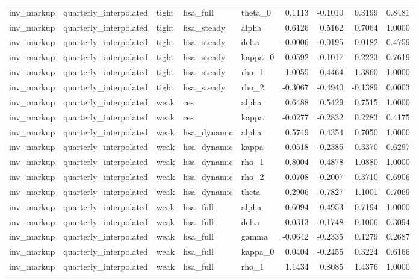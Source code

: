 \begin{tabular}{lllllrrrr}
inv\_markup & quarterly\_interpolated & tight & hsa\_full & theta\_0 & 0.1113 & -0.1010 & 0.3199 & 0.8481 \\
inv\_markup & quarterly\_interpolated & tight & hsa\_steady & alpha & 0.6126 & 0.5162 & 0.7064 & 1.0000 \\
inv\_markup & quarterly\_interpolated & tight & hsa\_steady & delta & -0.0006 & -0.0195 & 0.0182 & 0.4759 \\
inv\_markup & quarterly\_interpolated & tight & hsa\_steady & kappa\_0 & 0.0592 & -0.1017 & 0.2223 & 0.7619 \\
inv\_markup & quarterly\_interpolated & tight & hsa\_steady & rho\_1 & 1.0055 & 0.4464 & 1.3860 & 1.0000 \\
inv\_markup & quarterly\_interpolated & tight & hsa\_steady & rho\_2 & -0.3067 & -0.4940 & -0.1389 & 0.0003 \\
inv\_markup & quarterly\_interpolated & weak & ces & alpha & 0.6488 & 0.5429 & 0.7515 & 1.0000 \\
inv\_markup & quarterly\_interpolated & weak & ces & kappa & -0.0277 & -0.2832 & 0.2283 & 0.4175 \\
inv\_markup & quarterly\_interpolated & weak & hsa\_dynamic & alpha & 0.5749 & 0.4354 & 0.7050 & 1.0000 \\
inv\_markup & quarterly\_interpolated & weak & hsa\_dynamic & kappa & 0.0518 & -0.2385 & 0.3370 & 0.6297 \\
inv\_markup & quarterly\_interpolated & weak & hsa\_dynamic & rho\_1 & 0.8004 & 0.4878 & 1.0880 & 1.0000 \\
inv\_markup & quarterly\_interpolated & weak & hsa\_dynamic & rho\_2 & 0.0708 & -0.2007 & 0.3710 & 0.6906 \\
inv\_markup & quarterly\_interpolated & weak & hsa\_dynamic & theta & 0.2906 & -0.7827 & 1.1001 & 0.7069 \\
inv\_markup & quarterly\_interpolated & weak & hsa\_full & alpha & 0.6094 & 0.4953 & 0.7194 & 1.0000 \\
inv\_markup & quarterly\_interpolated & weak & hsa\_full & delta & -0.0313 & -0.1748 & 0.1006 & 0.3094 \\
inv\_markup & quarterly\_interpolated & weak & hsa\_full & gamma & -0.0642 & -0.2335 & 0.1279 & 0.2687 \\
inv\_markup & quarterly\_interpolated & weak & hsa\_full & kappa\_0 & 0.0404 & -0.2455 & 0.3224 & 0.6166 \\
inv\_markup & quarterly\_interpolated & weak & hsa\_full & rho\_1 & 1.1434 & 0.8085 & 1.4376 & 1.0000 \\

\end{tabular}

